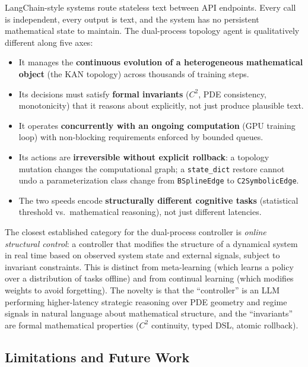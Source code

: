\documentclass[11pt,a4paper]{article}
\begin{document}
LangChain-style systems route stateless text between API endpoints. Every call is
independent, every output is text, and the system has no persistent mathematical state
to maintain. The dual-process topology agent is qualitatively different along five axes:

\begin{itemize}[nosep]
  \item It manages the \textbf{continuous evolution of a heterogeneous mathematical
  object} (the KAN topology) across thousands of training steps.

  \item Its decisions must satisfy \textbf{formal invariants} ($C^2$, PDE consistency,
  monotonicity) that it reasons about explicitly, not just produce plausible text.

  \item It operates \textbf{concurrently with an ongoing computation} (GPU training
  loop) with non-blocking requirements enforced by bounded queues.

  \item Its actions are \textbf{irreversible without explicit rollback}: a topology
  mutation changes the computational graph; a \texttt{state\_dict} restore cannot
  undo a parameterization class change from \texttt{BSplineEdge} to
  \texttt{C2SymbolicEdge}.

  \item The two speeds encode \textbf{structurally different cognitive tasks}
  (statistical threshold vs.\ mathematical reasoning), not just different latencies.
\end{itemize}

The closest established category for the dual-process controller is \emph{online
structural control}: a controller that modifies the structure of a dynamical system
in real time based on observed system state and external signals, subject to invariant
constraints. This is distinct from meta-learning (which learns a policy over a
distribution of tasks offline) and from continual learning
\citep{kirkpatrick2017overcoming} (which modifies weights to avoid forgetting). The
novelty is that the ``controller'' is an LLM performing higher-latency strategic reasoning
over PDE geometry and regime signals in natural language about
mathematical structure, and the ``invariants'' are formal mathematical properties
($C^2$ continuity, typed DSL, atomic rollback).

\subsection{Limitations and Future Work}
\label{sec:limfuture}
\end{document}
